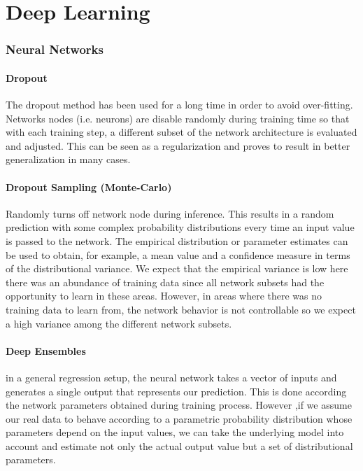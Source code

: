 \part{Deep Learning}

\section{Neural Networks}

\subsection{Dropout}
The dropout method has been used for a long time in order to avoid over-fitting. Networks nodes (i.e. neurons) are disable randomly during training time so that with each training step, a different subset of the network architecture is evaluated and adjusted. This can be seen as a regularization and proves to result in better generalization in many cases.

\subsection{Dropout Sampling (Monte-Carlo)}
Randomly turns off network node during inference. This results in a random prediction with some complex probability distributions every time an input value is passed to the network. The empirical distribution or parameter estimates can be used to obtain, for example, a mean value and a confidence measure in terms of the distributional variance. We expect that the empirical variance is low here there was an abundance of training data since all network subsets had the opportunity to learn in these areas. However, in areas where there was no training data to learn from, the network behavior is not controllable so we expect a high variance among the different network subsets.


\subsection{Deep Ensembles}
in a general regression setup, the neural network takes a vector of inputs and generates a single output that represents our prediction. This is done according the network parameters obtained during training process. However ,if we assume our real data to behave according to a parametric probability distribution whose parameters depend on the input values, we can take the underlying model into account and estimate not only the actual output value but a set of distributional parameters.

